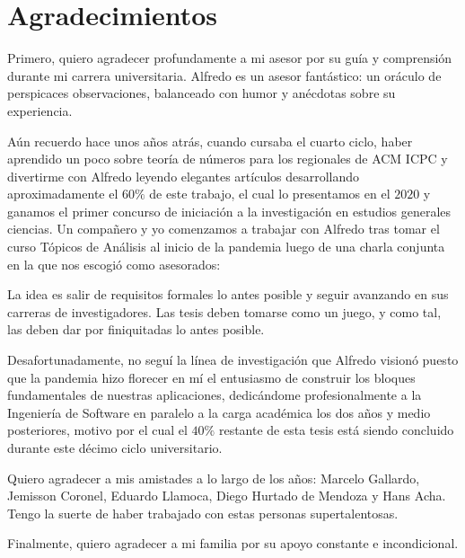 \chapter*{Agradecimientos}
\thispagestyle{empty}

\vspace{-0.5cm}

Primero, quiero agradecer profundamente a mi asesor
por su guía y comprensión durante mi carrera universitaria.
Alfredo es un asesor fantástico:
un oráculo de perspicaces observaciones,
balanceado con humor
y anécdotas sobre su experiencia.

Aún recuerdo hace unos años atrás,
cuando cursaba el cuarto ciclo,
haber aprendido un poco sobre teoría de números
para los regionales de ACM ICPC
y divertirme con Alfredo
leyendo elegantes artículos
desarrollando aproximadamente el \(60\%\) de este trabajo,
el cual lo presentamos en el \(2020\) y ganamos el
primer concurso de iniciación a la investigación en estudios generales ciencias.
Un compa\~nero y yo comenzamos a trabajar con Alfredo
tras tomar el curso Tópicos de Análisis al inicio de la pandemia
luego de una charla conjunta en la que nos escogió como asesorados:

\begin{displayquote}
La idea es salir de requisitos formales lo antes posible
y seguir avanzando en sus carreras de investigadores.
Las tesis deben tomarse como un juego,
y como tal,
las deben dar por finiquitadas lo antes posible.
\end{displayquote}

Desafortunadamente,
no seguí la línea de investigación
que Alfredo visionó
puesto que la pandemia
hizo florecer en mí
el entusiasmo de construir
los bloques fundamentales de nuestras aplicaciones,
dedicándome profesionalmente
a la Ingeniería de Software
en paralelo a la carga académica
los dos años y medio posteriores,
motivo por el cual el \(40\%\) restante de esta tesis
está siendo concluido durante este décimo ciclo universitario.

Quiero agradecer a mis amistades a lo largo de los años:
Marcelo Gallardo,
Jemisson Coronel,
Eduardo Llamoca,
Diego Hurtado de Mendoza
y
Hans Acha.
Tengo la suerte de haber trabajado con estas personas supertalentosas.

Finalmente, quiero agradecer a mi familia por su apoyo constante e incondicional.

